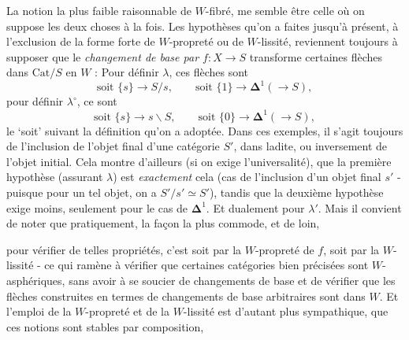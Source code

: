 \documentclass[11pt]{article}
\newcommand{\msp}[1]{\marginpar{\footnotesize [#1]}}
\newcommand{\Cat}{\mathrm{Cat}}
\begin{document}
\leavevmode\msp{page 37}La notion la plus faible raisonnable de $W$-fibré, me semble être celle où on suppose les deux choses à la fois. Les hypothèses qu'on a faites jusqu'à présent, à l'exclusion de la forme forte de $W$-propreté ou de $W$-lissité, reviennent toujours à supposer que le \textit{changement de base par $f : X\longrightarrow S$} transforme certaines flèches dans $\Cat/S$ en $W$ : Pour définir $\lambda$, ces flèches sont
\[
\text{soit } \{s\}\longrightarrow S/s,\qquad \text{soit } \{1\}\longrightarrow\mathbf{\Delta}^1(\longrightarrow S),
\]
pour définir $\lambda^\circ$, ce sont
\[
\text{soit } \{s\}\longrightarrow s\backslash S,\qquad \text{soit } \{0\}\longrightarrow\mathbf{\Delta}^1(\longrightarrow S),
\]
le `soit' suivant la définition qu'on a adoptée. Dans ces exemples, il s'agit toujours de l'inclusion de l'objet final d'une catégorie $S'$, dans ladite, ou inversement de l'objet initial. Cela montre d'ailleurs (si on exige l'universalité), que la première hypothèse (assurant $\lambda$) est \textit{exactement} cela (cas de l'inclusion d'un objet final $s'$ - puisque pour un tel objet, on a $S'/s'\simeq S'$), tandis que la deuxième hypothèse exige moins, seulement pour le cas de $\mathbf{\Delta}^1$. Et dualement pour $\lambda'$. Mais il convient de noter que pratiquement, la façon la plus commode, et de loin,

\leavevmode\msp{page 38}pour vérifier de telles propriétés, c'est soit par la $W$-propreté de $f$, soit par la $W$-lissité - ce qui ramène à vérifier que certaines catégories bien précisées sont $W$-asphériques, sans avoir à se soucier de changements de base et de vérifier que les flèches construites en termes de changements de base arbitraires sont dans $W$. Et l'emploi de la $W$-propreté et de la $W$-lissité est d'autant plus sympathique, que ces notions sont stables par composition,
\end{document}
